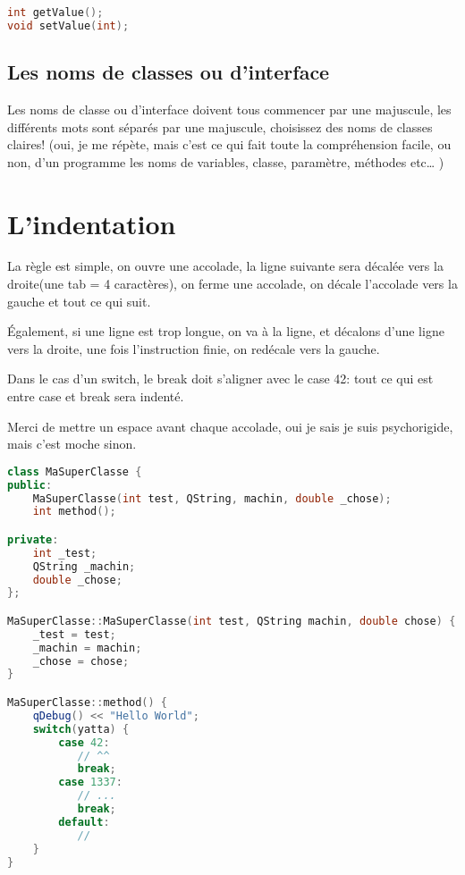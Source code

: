 \begin{lstlisting}[language=C++]
int getValue(); 
void setValue(int);
\end{lstlisting}

\subsection{Les noms de classes ou d'interface}\label{les-noms-de-classes-ou-dinterface}

Les noms de classe ou d'interface doivent tous commencer par une
majuscule, les différents mots sont séparés par une majuscule,
choisissez des noms de classes claires! (oui, je me répète, mais c'est
ce qui fait toute la compréhension facile, ou non, d'un programme les
noms de variables, classe, paramètre, méthodes etc\ldots{} )

\section{L'indentation}\label{lindentation}

La règle est simple, on ouvre une accolade, la ligne suivante sera
décalée vers la droite(une tab = 4 caractères), on ferme une accolade, on
décale l'accolade vers la gauche et tout ce qui suit.

Également, si une ligne est trop longue, on va à la ligne, et décalons
d'une ligne vers la droite, une fois l'instruction finie, on redécale
vers la gauche.

Dans le cas d'un switch, le break doit s'aligner avec le case 42: tout
ce qui est entre case et break sera indenté.

Merci de mettre un espace avant chaque accolade, oui je sais je suis
psychorigide, mais c'est moche sinon.

\begin{lstlisting}[language=C++]
class MaSuperClasse { 
public: 
	MaSuperClasse(int test, QString, machin, double _chose);
	int method();

private: 
	int _test;
	QString _machin;
	double _chose;
};

MaSuperClasse::MaSuperClasse(int test, QString machin, double chose) {
	_test = test;
	_machin = machin; 
	_chose = chose; 
}

MaSuperClasse::method() {
	qDebug() << "Hello World";
	switch(yatta) {
		case 42:
		   // ^^
		   break;
		case 1337:
		   // ...
		   break;
		default: 
		   //
	}
}
\end{lstlisting}


